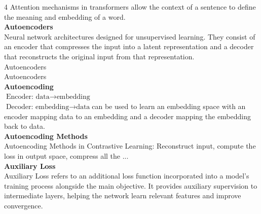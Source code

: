 \documentclass[8pt]{extarticle}
\begin{document}
\begin{multicols}{4}
Attention mechanisms in transformers allow the context of a sentence to define the meaning and embedding of a word.\\
\vspace{2pt}\textbf{Autoencoders}\\
Neural network architectures designed for unsupervised learning. They consist of an encoder that compresses the input into a latent representation and a decoder that reconstructs the original input from that representation.\\
Autoencoders\\
Autoencoders\\
\vspace{2pt}\textbf{Autoencoding}\\
$\text{Encoder: data} \rightarrow \text{embedding}$\\
$\text{Decoder: embedding} \rightarrow \text{data}$\Autoencoders can be used to learn an embedding space with an encoder mapping data to an embedding and a decoder mapping the embedding back to data.\\
\vspace{2pt}\textbf{Autoencoding Methods}\\
Autoencoding Methods in Contrastive Learning: Reconstruct input, compute the loss in output space, compress all the ...\\
\vspace{2pt}\textbf{Auxiliary Loss}\\
Auxiliary Loss refers to an additional loss function incorporated into a model's training process alongside the main objective. It provides auxiliary supervision to intermediate layers, helping the network learn relevant features and improve convergence.\\


\end{multicols}
\end{document}

